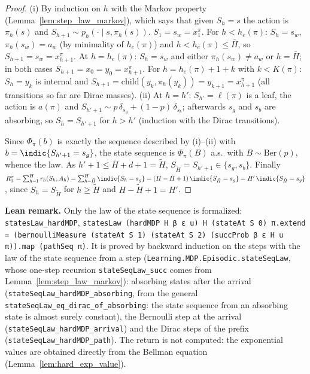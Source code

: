 \begin{proof}
\leanok
{}
(i) By induction on $h$ with the Markov property (Lemma~\ref{lem:step_law_markov}), which says
that given $S_h = s$ the action is $\pi_h(s)$ and $S_{h+1} \sim p_h(\cdot \mid s, \pi_h(s))$.
$S_1 = s_w = x^\pi_1$. For $h < h_e(\pi)$: $S_h = s_w$, $\pi_h(s_w) = a_w$ (by minimality of
$h_e(\pi)$) and $h < h_e(\pi) \le \bar H$, so $S_{h+1} = s_w = x^\pi_{h+1}$. At $h = h_e(\pi)$:
$S_h = s_w$ and either $\pi_h(s_w) \ne a_w$ or $h = \bar H$; in both cases
$S_{h+1} = x_0 = y_0 = x^\pi_{h+1}$. For $h = h_e(\pi) + 1 + k$ with $k < K(\pi)$: $S_h = y_k$ is
internal and $S_{h+1} = \mathrm{child}(y_k, \pi_h(y_k)) = y_{k+1} = x^\pi_{h+1}$ (all transitions
so far are Dirac masses). (ii) At $h = h'$: $S_{h'} = \ell(\pi)$ is a leaf, the action is
$a(\pi)$ and $S_{h'+1} \sim p\,\delta_{s_g} + (1-p)\,\delta_{s_b}$; afterwards $s_g$ and $s_b$
are absorbing, so $S_h = S_{h'+1}$ for $h > h'$ (induction with the Dirac transitions).

Since $\Phi_\pi(b)$ is exactly the sequence described by (i)--(ii) with $b = \indic\{S_{h'+1} = s_g\}$,
the state sequence is $\Phi_\pi(B)$ a.s.\ with $B \sim \mathrm{Ber}(p)$, whence the law. As
$h' + 1 \le \bar H + d + 1 = \tilde H$, $S_{\tilde H} = S_{h'+1} \in \{s_g, s_b\}$. Finally
$R^\pi_1 = \sum_{h=1}^H r_h(S_h, A_h) = \sum_{h=\tilde H}^{H}\indic\{S_h = s_g\}
= (H - \tilde H + 1)\,\indic\{S_{\tilde H} = s_g\} = H'\,\indic\{S_{\tilde H} = s_g\}$, since
$S_h = S_{\tilde H}$ for $h \ge \tilde H$ and $H - \tilde H + 1 = H'$.
\end{proof}

\textbf{Lean remark.} Only the law of the state sequence is formalized:
\texttt{statesLaw\_hardMDP}, \texttt{statesLaw (hardMDP H β ε u) H (stateAt S 0) π.extend = (bernoulliMeasure (stateAt S 1) (stateAt S 2) (succProb β ε H u π)).map (pathSeq π)}.
It is proved by backward induction on the steps with the law of the state sequence from a step
(\texttt{Learning.MDP.Episodic.stateSeqLaw}, whose one-step recursion \texttt{stateSeqLaw\_succ} comes
from Lemma~\ref{lem:step_law_markov}): absorbing states after the arrival
(\texttt{stateSeqLaw\_hardMDP\_absorbing}, from the general
\texttt{stateSeqLaw\_eq\_dirac\_of\_absorbing}: the state sequence from an absorbing state is
almost surely constant), the Bernoulli step at the arrival
(\texttt{stateSeqLaw\_hardMDP\_arrival}) and the Dirac steps of the prefix
(\texttt{stateSeqLaw\_hardMDP\_path}). The return is not computed: the exponential values are obtained
directly from the Bellman equation (Lemma~\ref{lem:hard_exp_value}).

